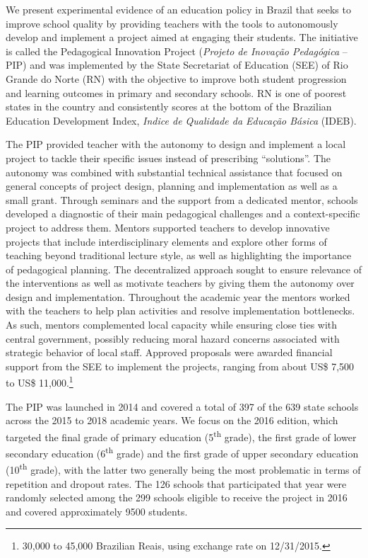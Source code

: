 \documentclass[11pt,a4paper]{article}
\begin{document}

We present experimental evidence of an education policy in Brazil that seeks to improve school quality by providing teachers with the tools to autonomously develop and implement a project aimed at engaging their students. The initiative is called the Pedagogical Innovation Project (\textit{Projeto de Inovação Pedagógica} -- PIP) and was implemented by the State Secretariat of Education (SEE) of Rio Grande do Norte (RN) with the objective to improve both student progression and learning outcomes in primary and secondary schools. RN is one of poorest states in the country and consistently scores at the bottom of the Brazilian Education Development Index, \textit{Indice de Qualidade da Educação Básica} (IDEB). 


The PIP provided teacher with the autonomy to design and implement a local project to tackle their specific issues instead of prescribing ``solutions''. The autonomy was combined with substantial technical assistance that focused on general concepts of project design, planning and implementation as well as a small grant. Through seminars and the support from a dedicated mentor, schools developed a diagnostic of their main pedagogical challenges and a context-specific project to address them. Mentors supported teachers to develop innovative projects that include interdisciplinary elements and explore other forms of teaching beyond traditional lecture style, as well as highlighting the importance of pedagogical planning. The decentralized approach sought to ensure relevance of the interventions as well as motivate teachers by giving them the autonomy over design and implementation. Throughout the academic year the mentors worked with the teachers to help plan activities and resolve implementation bottlenecks. As such, mentors complemented local capacity while ensuring close ties with central government, possibly reducing moral hazard concerns associated with strategic behavior of local staff. Approved proposals were awarded financial support from the SEE to implement the projects, ranging from about US\$ 7,500 to US\$ 11,000.\footnote{30,000 to 45,000 Brazilian Reais, using exchange rate on 12/31/2015.}


The PIP was launched in 2014 and covered a total of 397 of the 639 state schools across the 2015 to 2018 academic years. We focus on the 2016 edition, which targeted the final grade of primary education (5\textsuperscript{th} grade), the first grade of lower secondary education (6\textsuperscript{th} grade) and the first grade of upper secondary education (10\textsuperscript{th} grade), with the latter two generally being the most problematic in terms of repetition and dropout rates. The 126 schools that participated that year were randomly selected among the 299 schools eligible to receive the project in 2016 and covered approximately 9500 students. 
\end{document}
